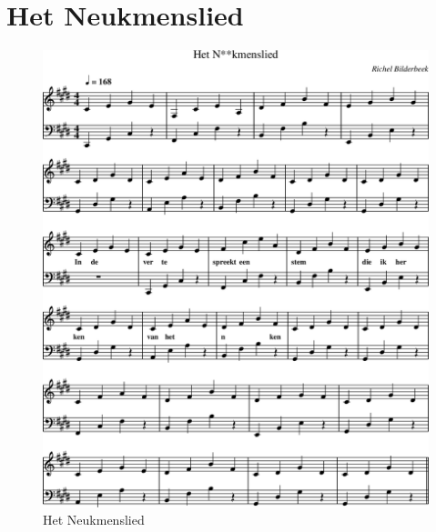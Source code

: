 \chapter{Het Neukmenslied}



\begin{figure}[!htbp]
  \includegraphics[width=\textwidth,height=\textheight,keepaspectratio]{../songs/15_het_neukmenslied.png}
  \caption{Het Neukmenslied}
  \label{fig:15_het_neukmenslied}
\end{figure}
